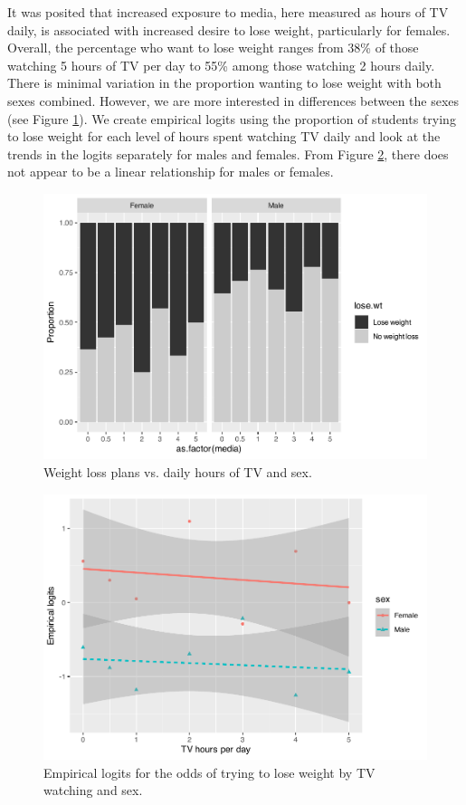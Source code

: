 \documentclass[
]{krantz}
\begin{document}
It was posited that increased exposure to media, here measured as hours of TV daily, is associated with increased desire to lose weight, particularly for females. Overall, the percentage who want to lose weight ranges from 38\% of those watching 5 hours of TV per day to 55\% among those watching 2 hours daily. There is minimal variation in the proportion wanting to lose weight with both sexes combined. However, we are more interested in differences between the sexes (see Figure \ref{fig:mediaXsex}). We create empirical logits using the proportion of students trying to lose weight for each level of hours spent watching TV daily and look at the trends in the logits separately for males and females. From Figure \ref{fig:logitmediasex}, there does not appear to be a linear relationship for males or females.

\begin{figure}

{\centering \includegraphics[width=0.6\linewidth]{bookdown-BeyondMLR_files/figure-latex/mediaXsex-1} 

}

\caption{Weight loss plans vs. daily hours of TV and sex.}\label{fig:mediaXsex}
\end{figure}

\begin{figure}

{\centering \includegraphics[width=0.6\linewidth]{bookdown-BeyondMLR_files/figure-latex/logitmediasex-1} 

}

\caption{Empirical logits for the odds of trying to lose weight by TV watching and sex.}\label{fig:logitmediasex}
\end{figure}
\end{document}
